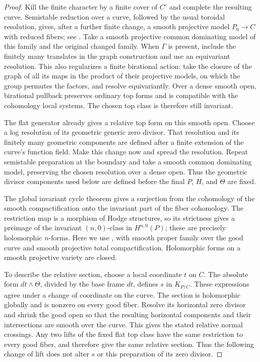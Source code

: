 \begin{proof}
Kill the finite character by a finite cover of $C^\circ$ and complete
the resulting curve.  Semistable reduction over a curve, followed by the
usual toroidal resolution, gives, after a further finite change, a smooth
projective model $P_0\to C$ with reduced fibers; see
\cite[Chapter II, semistable reduction over a curve]{KKMSD}.
Take a smooth projective common dominating model of this family and the
original changed family.  When $\Gamma$ is present, include the finitely
many translates in the graph construction and use an equivariant
resolution.  This also regularizes a finite birational action: take the
closure of the graph of all its maps in the product of their projective
models, on which the group permutes the factors, and resolve
equivariantly.  Over a dense smooth open, birational pullback preserves
ordinary top forms and is compatible with the cohomology local systems.
The chosen top class is therefore still invariant.

The flat generator already gives a relative top form on this smooth
open.  Choose a log resolution of its geometric generic zero divisor.
That resolution and its finitely many geometric components are defined
after a finite extension of the curve's function field.  Make this
change now and spread the resolution.  Repeat semistable preparation
at the boundary and take a smooth common dominating model, preserving
the chosen resolution over a dense open.  Thus the geometric divisor
components used below are defined before the final $P$, $H$, and
$\Theta$ are fixed.

The global invariant cycle theorem gives a surjection from the
cohomology of the smooth compactification onto the invariant part of
the fiber cohomology.  The restriction map is a morphism of Hodge
structures, so its strictness gives a preimage of the invariant
$(n,0)$-class in $H^{n,0}(P)$; these are precisely holomorphic $n$-forms.
Here we use \cite[Theorem~4.1.1(ii) and Corollary~4.1.2]{Deligne71}, with
smooth proper family over the good curve and smooth projective total
compactification.  Holomorphic forms on a smooth projective variety are
closed.

To describe the relative section, choose a local coordinate $t$ on $C$.
The absolute form $dt\wedge\Theta$, divided by the base frame $dt$,
defines $s$ in $K_{P/C}$.  These expressions agree under a change of
coordinate on the curve.  The section is holomorphic globally and is
nonzero on every good fiber.  Resolve its horizontal zero divisor and
shrink the good open so that the resulting horizontal components and
their intersections are smooth over the curve.  This gives the stated
relative normal crossings.  Any two lifts of the fixed flat top class
have the same restriction to every good fiber, and therefore give the
same relative section.  Thus the following change of lift does not alter
$s$ or this preparation of its zero divisor.


\end{proof}
